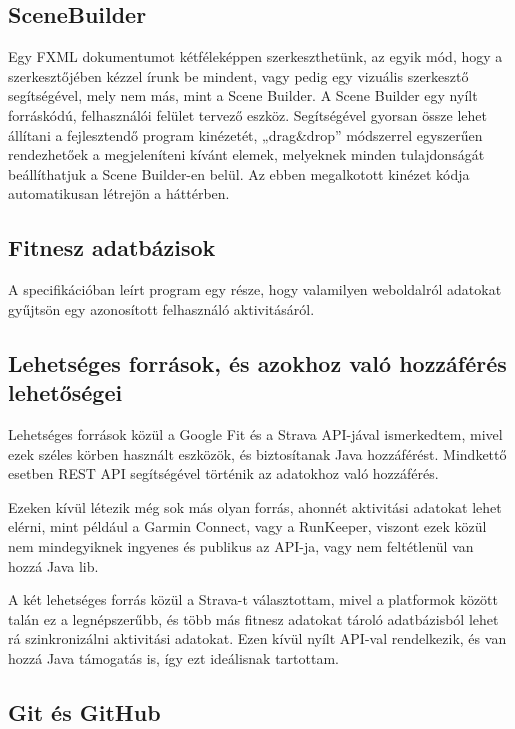 \subsection{SceneBuilder}

Egy FXML dokumentumot kétféleképpen szerkeszthetünk, az egyik mód, hogy a szerkesztőjében kézzel írunk be mindent, vagy pedig egy vizuális szerkesztő segítségével, mely nem más, mint a Scene Builder.
A Scene Builder egy nyílt forráskódú, felhasználói felület tervező eszköz.
Segítségével gyorsan össze lehet állítani a fejlesztendő program kinézetét, „drag\&drop” módszerrel egyszerűen rendezhetőek a megjeleníteni kívánt elemek, melyeknek minden tulajdonságát beállíthatjuk a Scene Builder-en belül.
Az ebben megalkotott kinézet kódja automatikusan létrejön a háttérben.

\subsection{Fitnesz adatbázisok}

A specifikációban leírt program egy része, hogy valamilyen weboldalról adatokat gyűjtsön egy azonosított felhasználó aktivitásáról. 

\subsection*{Lehetséges források, és azokhoz való hozzáférés lehetőségei}

Lehetséges források közül a Google Fit és a Strava API-jával ismerkedtem, mivel ezek széles körben használt eszközök, és biztosítanak Java hozzáférést.
Mindkettő esetben REST API segítségével történik az adatokhoz való hozzáférés.

Ezeken kívül létezik még sok más olyan forrás, ahonnét aktivitási adatokat lehet elérni, mint például a Garmin Connect, vagy a RunKeeper, viszont ezek közül nem mindegyiknek ingyenes és publikus az API-ja, vagy nem feltétlenül van hozzá Java lib. 

A két lehetséges forrás közül a Strava-t választottam, mivel a platformok között talán ez a legnépszerűbb, és több más fitnesz adatokat tároló adatbázisból lehet rá szinkronizálni aktivitási adatokat.
Ezen kívül nyílt API-val rendelkezik, és van hozzá Java támogatás is, így ezt ideálisnak tartottam.

\subsection{Git és GitHub}

